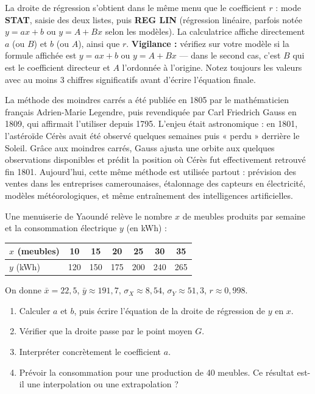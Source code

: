 \documentclass[11pt]{article}
\begin{document}
\begin{methode}[À la calculatrice]
La droite de régression s'obtient dans le même menu que le coefficient $r$ : mode \textbf{STAT}, saisie des deux listes, puis \textbf{REG LIN} (régression linéaire, parfois notée $y = ax + b$ ou $y = A + Bx$ selon les modèles). La calculatrice affiche directement $a$ (ou $B$) et $b$ (ou $A$), ainsi que $r$. \textbf{Vigilance :} vérifiez sur votre modèle si la formule affichée est $y = ax + b$ ou $y = A + Bx$ — dans le second cas, c'est $B$ qui est le coefficient directeur et $A$ l'ordonnée à l'origine. Notez toujours les valeurs avec au moins 3 chiffres significatifs avant d'écrire l'équation finale.
\end{methode}

\begin{savaistu}
La méthode des moindres carrés a été publiée en 1805 par le mathématicien français Adrien-Marie Legendre, puis revendiquée par Carl Friedrich Gauss en 1809, qui affirmait l'utiliser depuis 1795. L'enjeu était astronomique : en 1801, l'astéroïde Cérès avait été observé quelques semaines puis « perdu » derrière le Soleil. Grâce aux moindres carrés, Gauss ajusta une orbite aux quelques observations disponibles et prédit la position où Cérès fut effectivement retrouvé fin 1801. Aujourd'hui, cette même méthode est utilisée partout : prévision des ventes dans les entreprises camerounaises, étalonnage des capteurs en électricité, modèles météorologiques, et même entraînement des intelligences artificielles.
\end{savaistu}

\begin{exercice}
Une menuiserie de Yaoundé relève le nombre $x$ de meubles produits par semaine et la consommation électrique $y$ (en kWh) :
\begin{center}
\begin{tabular}{|l|cccccc|}\hline
\rowcolor{popblueL} $x$ (meubles) & 10 & 15 & 20 & 25 & 30 & 35 \\ \hline
$y$ (kWh) & 120 & 150 & 175 & 200 & 240 & 265 \\ \hline
\end{tabular}
\end{center}
On donne $\bar{x} = 22{,}5$, $\bar{y} \approx 191{,}7$, $\sigma_X \approx 8{,}54$, $\sigma_Y \approx 51{,}3$, $r \approx 0{,}998$.
\begin{enumerate}
  \item Calculer $a$ et $b$, puis écrire l'équation de la droite de régression de $y$ en $x$.
  \item Vérifier que la droite passe par le point moyen $G$.
  \item Interpréter concrètement le coefficient $a$.
  \item Prévoir la consommation pour une production de 40 meubles. Ce résultat est-il une interpolation ou une extrapolation ?
\end{enumerate}
\end{exercice}
\end{document}
